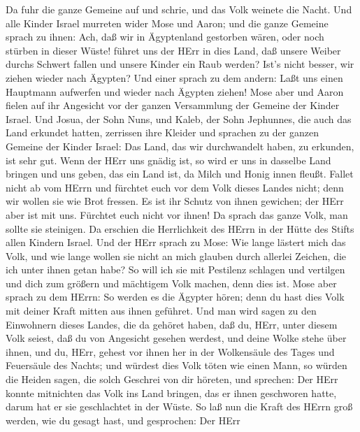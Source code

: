  Da fuhr die ganze Gemeine auf und schrie, und das Volk
weinete die Nacht.  Und alle Kinder Israel murreten wider
Mose und Aaron; und die ganze Gemeine sprach zu ihnen: Ach, daß wir in
Ägyptenland gestorben wären, oder noch stürben in dieser Wüste!
 führet uns der HErr in dies Land, daß unsere Weiber durchs
Schwert fallen und unsere Kinder ein Raub werden? Ist's nicht besser,
wir ziehen wieder nach Ägypten?  Und einer sprach zu dem
andern: Laßt uns einen Hauptmann aufwerfen und wieder nach Ägypten
ziehen!  Mose aber und Aaron fielen auf ihr Angesicht vor
der ganzen Versammlung der Gemeine der Kinder Israel.  Und
Josua, der Sohn Nuns, und Kaleb, der Sohn Jephunnes, die auch das Land
erkundet hatten, zerrissen ihre Kleider  und sprachen zu der
ganzen Gemeine der Kinder Israel: Das Land, das wir durchwandelt haben,
zu erkunden, ist sehr gut.  Wenn der HErr uns gnädig ist, so
wird er uns in dasselbe Land bringen und uns geben, das ein Land ist, da
Milch und Honig innen fleußt.  Fallet nicht ab vom HErrn und
fürchtet euch vor dem Volk dieses Landes nicht; denn wir wollen sie wie
Brot fressen. Es ist ihr Schutz von ihnen gewichen; der HErr aber ist
mit uns. Fürchtet euch nicht vor ihnen!  Da sprach das
ganze Volk, man sollte sie steinigen. Da erschien die Herrlichkeit des
HErrn in der Hütte des Stifts allen Kindern Israel.  Und
der HErr sprach zu Mose: Wie lange lästert mich das Volk, und wie lange
wollen sie nicht an mich glauben durch allerlei Zeichen, die ich unter
ihnen getan habe?  So will ich sie mit Pestilenz schlagen
und vertilgen und dich zum größern und mächtigem Volk machen, denn dies
ist.  Mose aber sprach zu dem HErrn: So werden es die
Ägypter hören; denn du hast dies Volk mit deiner Kraft mitten aus ihnen
geführet.  Und man wird sagen zu den Einwohnern dieses
Landes, die da gehöret haben, daß du, HErr, unter diesem Volk seiest,
daß du von Angesicht gesehen werdest, und deine Wolke stehe über ihnen,
und du, HErr, gehest vor ihnen her in der Wolkensäule des Tages und
Feuersäule des Nachts;  und würdest dies Volk töten wie
einen Mann, so würden die Heiden sagen, die solch Geschrei von dir
höreten, und sprechen:  Der HErr konnte mitnichten das Volk
ins Land bringen, das er ihnen geschworen hatte, darum hat er sie
geschlachtet in der Wüste.  So laß nun die Kraft des HErrn
groß werden, wie du gesagt hast, und gesprochen:  Der HErr
